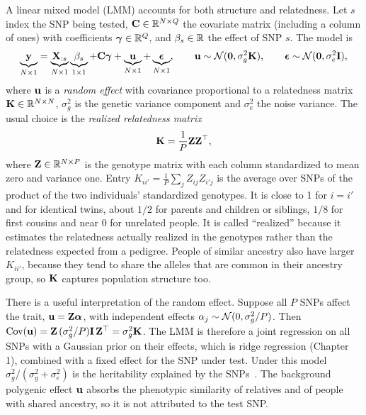 A linear mixed model (LMM) accounts for both structure and relatedness. Let $s$ index the SNP being tested, $\mathbf{C}\in\mathbb{R}^{N\times Q}$ the covariate matrix (including a column of ones) with coefficients $\boldsymbol{\gamma}\in\mathbb{R}^Q$, and $\beta_s\in\mathbb{R}$ the effect of SNP $s$. The model is
\begin{equation}
  \underbrace{\mathbf{y}}_{N\times1} = \underbrace{\mathbf{X}_{:s}}_{N\times1}\underbrace{\beta_s}_{1\times1} + \mathbf{C}\boldsymbol{\gamma} + \underbrace{\mathbf{u}}_{N\times1} + \underbrace{\boldsymbol{\epsilon}}_{N\times1},\qquad
  \mathbf{u}\sim\mathcal{N}(\mathbf{0},\sigma_g^2\mathbf{K}),\qquad \boldsymbol{\epsilon}\sim\mathcal{N}(\mathbf{0},\sigma_e^2\mathbf{I}),
  \label{eq:lmm}
\end{equation}
where $\mathbf{u}$ is a \emph{random effect} with covariance proportional to a relatedness matrix $\mathbf{K}\in\mathbb{R}^{N\times N}$, $\sigma_g^2$ is the genetic variance component and $\sigma_e^2$ the noise variance. The usual choice is the \emph{realized relatedness matrix}
\begin{equation}
  \mathbf{K} = \frac1P\mathbf{Z}\mathbf{Z}^\top,
\end{equation}
where $\mathbf{Z}\in\mathbb{R}^{N\times P}$ is the genotype matrix with each column standardized to mean zero and variance one. Entry $K_{ii'}=\frac1P\sum_jZ_{ij}Z_{i'j}$ is the average over SNPs of the product of the two individuals' standardized genotypes. It is close to 1 for $i=i'$ and for identical twins, about $1/2$ for parents and children or siblings, $1/8$ for first cousins and near 0 for unrelated people. It is called ``realized'' because it estimates the relatedness actually realized in the genotypes rather than the relatedness expected from a pedigree. People of similar ancestry also have larger $K_{ii'}$, because they tend to share the alleles that are common in their ancestry group, so $\mathbf{K}$ captures population structure too.

There is a useful interpretation of the random effect. Suppose all $P$ SNPs affect the trait, $\mathbf{u}=\mathbf{Z}\boldsymbol{\alpha}$, with independent effects $\alpha_j\sim\mathcal{N}(0,\sigma_g^2/P)$. Then $\operatorname{Cov}(\mathbf{u})=\mathbf{Z}\,(\sigma_g^2/P)\mathbf{I}\,\mathbf{Z}^\top=\sigma_g^2\mathbf{K}$. The LMM is therefore a joint regression on all SNPs with a Gaussian prior on their effects, which is ridge regression (Chapter 1), combined with a fixed effect for the SNP under test. Under this model $\sigma_g^2/(\sigma_g^2+\sigma_e^2)$ is the heritability explained by the SNPs~\citep{yang2010}. The background polygenic effect $\mathbf{u}$ absorbs the phenotypic similarity of relatives and of people with shared ancestry, so it is not attributed to the test SNP.

